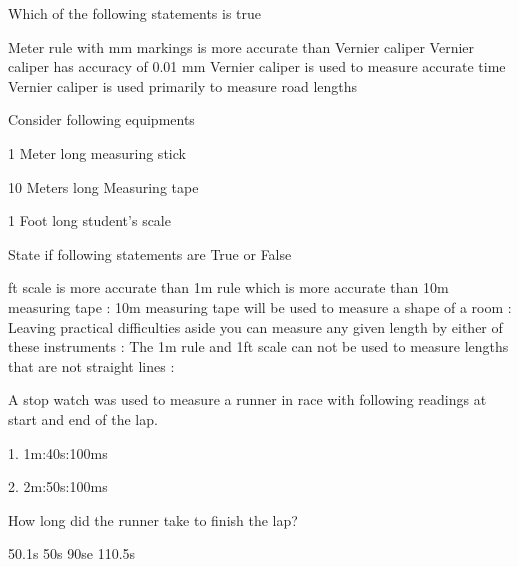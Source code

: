\documentclass[12pt,addpoints]{exam}
\begin{document}
\begin{questions}

\myquestion[1] Which of the following statements is true
	\begin{choices}
	\choice Meter rule with mm markings is more accurate than Vernier caliper
	\correctchoice Vernier caliper has accuracy of 0.01 mm
	\choice Vernier caliper is used to measure accurate time
	\choice Vernier caliper is used primarily to measure road lengths
	\end{choices}


\myquestion[4] Consider following equipments


1 Meter long measuring stick

10 Meters long Measuring tape

1 Foot long student's scale


State if following statements are True or False


	\begin{choices}
     ft scale is more accurate than 1m rule which is more accurate than 10m measuring tape : 
	\correctchoice 10m measuring tape will be used to measure a shape of a room : \xblackout{shblnk}
	\choice Leaving practical difficulties aside you can measure any given length by either of these instruments : \xblackout{shblnk}
	\correctchoice The 1m rule and 1ft scale can not be used to measure lengths that are not straight lines : \xblackout{shblnk}
	\end{choices}


	\myquestion[1] A stop watch was used to measure a runner in race with following readings at start and end of the lap.

    1.	1m:40s:100ms

	2.	2m:50s:100ms

	How long did the runner take to finish the lap?

	\begin{choices}
	\choice 50.1s
	\correctchoice 50s
	\choice 90se
	\choice 110.5s
  \end{choices}


\end{questions}
\end{document}
